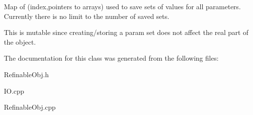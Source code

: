 Map of (index,pointers to arrays) used to save sets of values for all parameters. Currently there is no limit to the number of saved sets.

This is mutable since creating/storing a param set does not affect the \textquotesingle{}real\textquotesingle{} part of the object. 

The documentation for this class was generated from the following files\+:\begin{DoxyCompactItemize}
\item 
Refinable\+Obj.\+h\item 
I\+O.\+cpp\item 
Refinable\+Obj.\+cpp\end{DoxyCompactItemize}
